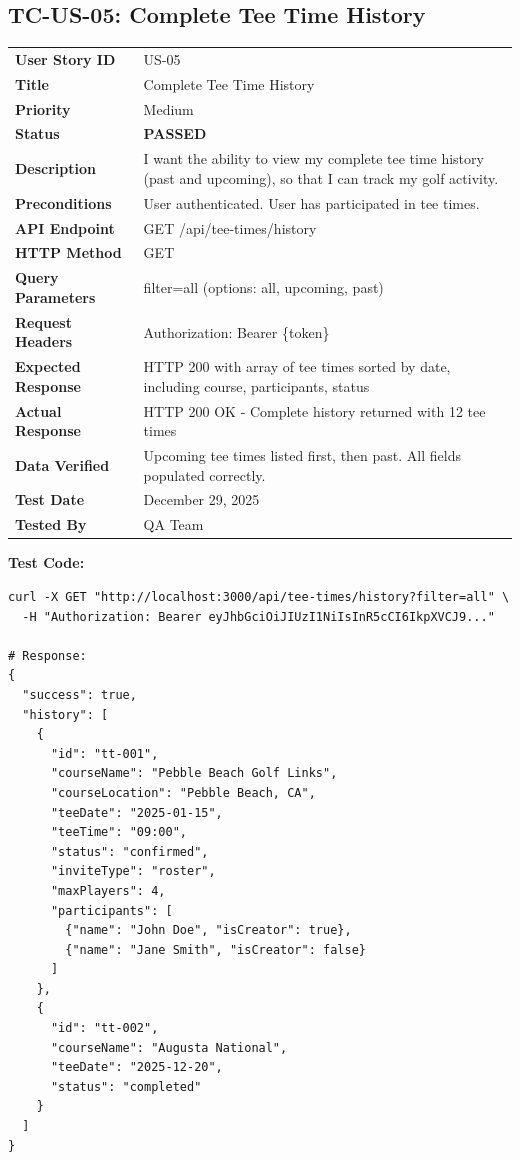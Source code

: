 \documentclass[11pt,a4paper]{article}
\newcommand{\passed}{\textcolor{pass}{\textbf{PASSED}}}
\begin{document}
\vspace{0.5cm}


\subsection{TC-US-05: Complete Tee Time History}

\begin{tabularx}{\textwidth}{|p{3.2cm}|Y|}
\hline
{}
 \\
\hline
\textbf{User Story ID} & US-05 \\
\hline
\textbf{Title} & Complete Tee Time History \\
\hline
\textbf{Priority} & Medium \\
\hline
\textbf{Status} & \passed \\
\hline
\textbf{Description} & I want the ability to view my complete tee time history (past and upcoming), so that I can track my golf activity. \\
\hline
\textbf{Preconditions} & User authenticated. User has participated in tee times. \\
\hline
\textbf{API Endpoint} & GET /api/tee-times/history \\
\hline
\textbf{HTTP Method} & GET \\
\hline
\textbf{Query Parameters} & filter=all (options: all, upcoming, past) \\
\hline
\textbf{Request Headers} & Authorization: Bearer \{token\} \\
\hline
\textbf{Expected Response} & HTTP 200 with array of tee times sorted by date, including course, participants, status \\
\hline
\textbf{Actual Response} & HTTP 200 OK - Complete history returned with 12 tee times \\
\hline
\textbf{Data Verified} & Upcoming tee times listed first, then past. All fields populated correctly. \\
\hline
\textbf{Test Date} & December 29, 2025 \\
\hline
\textbf{Tested By} & QA Team \\
\hline
\end{tabularx}

\vspace{0.3cm}
\textbf{Test Code:}
\begin{lstlisting}
curl -X GET "http://localhost:3000/api/tee-times/history?filter=all" \
  -H "Authorization: Bearer eyJhbGciOiJIUzI1NiIsInR5cCI6IkpXVCJ9..."

# Response:
{
  "success": true,
  "history": [
    {
      "id": "tt-001",
      "courseName": "Pebble Beach Golf Links",
      "courseLocation": "Pebble Beach, CA",
      "teeDate": "2025-01-15",
      "teeTime": "09:00",
      "status": "confirmed",
      "inviteType": "roster",
      "maxPlayers": 4,
      "participants": [
        {"name": "John Doe", "isCreator": true},
        {"name": "Jane Smith", "isCreator": false}
      ]
    },
    {
      "id": "tt-002",
      "courseName": "Augusta National",
      "teeDate": "2025-12-20",
      "status": "completed"
    }
  ]
}
\end{lstlisting}
\end{document}
